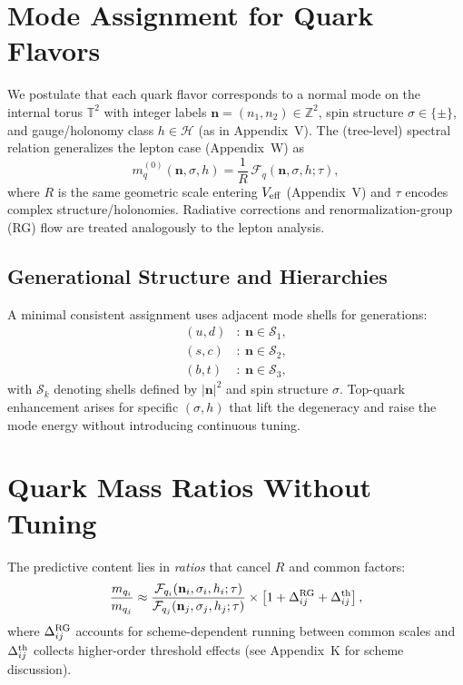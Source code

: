 \section{Mode Assignment for Quark Flavors}
\label{sec:QA_modes}
We postulate that each quark flavor corresponds to a normal mode on the internal torus $\mathbb{T}^2$ with
integer labels $\mathbf{n}=(n_1,n_2)\in\mathbb{Z}^2$, spin structure $\sigma\in\{\pm\}$,
and gauge/holonomy class $h\in \mathcal{H}$ (as in Appendix~V).
The (tree-level) spectral relation generalizes the lepton case (Appendix~W) as
\begin{equation}
  m_q^{(0)}(\mathbf{n},\sigma,h) = \frac{1}{R}\,\mathcal{F}_q\!\left(\mathbf{n},\sigma,h;\tau\right),
  \label{eq:QA_masses_tree}
\end{equation}
where $R$ is the same geometric scale entering $V_{\rm eff}$ (Appendix~V)
and $\tau$ encodes complex structure/holonomies.
Radiative corrections and renormalization-group (RG) flow are treated analogously to the lepton analysis.

\subsection{Generational Structure and Hierarchies}
A minimal consistent assignment uses adjacent mode shells for generations:
\begin{align}
  (u,d) &: \ \mathbf{n}\in \mathcal{S}_1, \nonumber\\
  (s,c) &: \ \mathbf{n}\in \mathcal{S}_2, \nonumber\\
  (b,t) &: \ \mathbf{n}\in \mathcal{S}_3, \label{eq:QA_shells}
\end{align}
with $\mathcal{S}_k$ denoting shells defined by $|\mathbf{n}|^2$ and spin structure $\sigma$.
Top-quark enhancement arises for specific $(\sigma,h)$ that lift the degeneracy and raise the mode energy
without introducing continuous tuning.

\section{Quark Mass Ratios Without Tuning}
\label{sec:QA_mass_ratios}
The predictive content lies in \emph{ratios} that cancel $R$ and common factors:
\begin{equation}
  \frac{m_{q_i}}{m_{q_j}} \approx
  \frac{\mathcal{F}_{q_i}(\mathbf{n}_i,\sigma_i,h_i;\tau)}{\mathcal{F}_{q_j}(\mathbf{n}_j,\sigma_j,h_j;\tau)}
  \times \left[1+\Delta^{\rm RG}_{ij} + \Delta^{\rm th}_{ij}\right],
  \label{eq:QA_ratios}
\end{equation}
where $\Delta^{\rm RG}_{ij}$ accounts for scheme-dependent running between common scales
and $\Delta^{\rm th}_{ij}$ collects higher-order threshold effects (see Appendix~K for scheme discussion).
